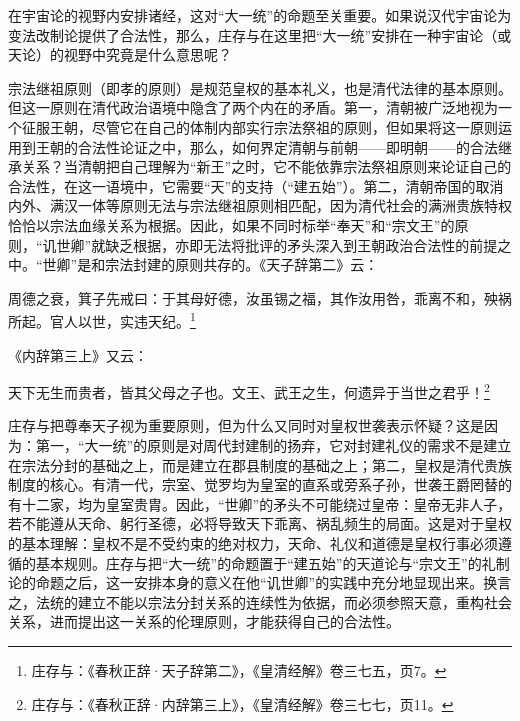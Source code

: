 \documentclass[a4paper, 12pt, openright]{ctexbook}
\renewenvironment{quote}
  {\list{}{\rightmargin2\ccwd \leftmargin2\ccwd \itemindent=2\ccwd \listparindent=2\ccwd}%
   \item\relax\small\kaishu\color{black}}
  {\endlist}
\begin{document}
在宇宙论的视野内安排诸经，这对“大一统”的命题至关重要。如果说汉代宇宙论为变法改制论提供了合法性，那么，庄存与在这里把“大一统”安排在一种宇宙论（或天论）的视野中究竟是什么意思呢？

宗法继祖原则（即孝的原则）是规范皇权的基本礼义，也是清代法律的基本原则。但这一原则在清代政治语境中隐含了两个内在的矛盾。第一，清朝被广泛地视为一个征服王朝，尽管它在自己的体制内部实行宗法祭祖的原则，但如果将这一原则运用到王朝的合法性论证之中，那么，如何界定清朝与前朝——即明朝——的合法继承关系？当清朝把自己理解为“新王”之时，它不能依靠宗法祭祖原则来论证自己的合法性，在这一语境中，它需要“天”的支持（“建五始”）。第二，清朝帝国的取消内外、满汉一体等原则无法与宗法继祖原则相匹配，因为清代社会的满洲贵族特权恰恰以宗法血缘关系为根据。因此，如果不同时标举“奉天”和“宗文王”的原则，“讥世卿”就缺乏根据，亦即无法将批评的矛头深入到王朝政治合法性的前提之中。“世卿”是和宗法封建的原则共存的。《天子辞第二》云：

\begin{quote}
周德之衰，箕子先戒曰：于其母好德，汝虽锡之福，其作汝用咎，乖离不和，殃祸所起。官人以世，实违天纪。\footnote{庄存与：《春秋正辞·天子辞第二》，《皇清经解》卷三七五，页7。}
\end{quote}

《内辞第三上》又云：

\begin{quote}
天下无生而贵者，皆其父母之子也。文王、武王之生，何遗异于当世之君乎！\footnote{庄存与：《春秋正辞·内辞第三上》，《皇清经解》卷三七七，页11。}
\end{quote}

庄存与把尊奉天子视为重要原则，但为什么又同时对皇权世袭表示怀疑？这是因为：第一，“大一统”的原则是对周代封建制的扬弃，它对封建礼仪的需求不是建立在宗法分封的基础之上，而是建立在郡县制度的基础之上；第二，皇权是清代贵族制度的核心。有清一代，宗室、觉罗均为皇室的直系或旁系子孙，世袭王爵罔替的有十二家，均为皇室贵胄。因此，“世卿”的矛头不可能绕过皇帝：皇帝无非人子，若不能遵从天命、躬行圣德，必将导致天下乖离、祸乱频生的局面。这是对于皇权的基本理解：皇权不是不受约束的绝对权力，天命、礼仪和道德是皇权行事必须遵循的基本规则。庄存与把“大一统”的命题置于“建五始”的天道论与“宗文王”的礼制论的命题之后，这一安排本身的意义在他“讥世卿”的实践中充分地显现出来。换言之，法统的建立不能以宗法分封关系的连续性为依据，而必须参照天意，重构社会关系，进而提出这一关系的伦理原则，才能获得自己的合法性。
\end{document}

